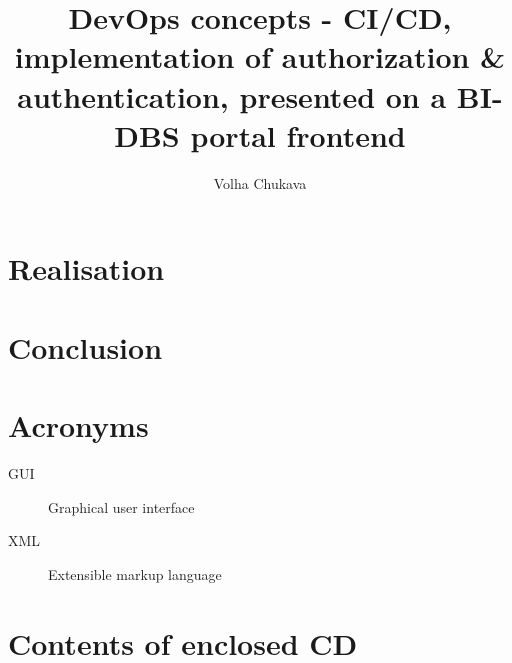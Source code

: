 \documentclass[thesis=B,english]{template/FITthesis}[2019/12/23]
\title{DevOps concepts - CI/CD, implementation of authorization \& authentication, presented on a BI-DBS portal frontend}
\author{Volha Chukava} %
\begin{document}





% 
% 



\chapter{Realisation}  %

\chapter{Conclusion}








\chapter{Acronyms}
\begin{description}
	\item[GUI] Graphical user interface
	\item[XML] Extensible markup language
\end{description}


\chapter{Contents of enclosed CD}


\end{document}
